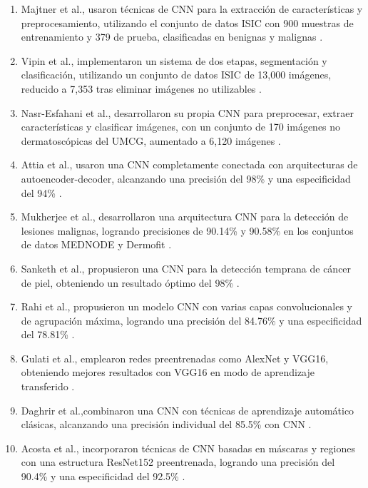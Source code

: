 \begin{enumerate}
    \item Majtner et al., usaron técnicas de CNN para la extracción de características y preprocesamiento, utilizando el conjunto de datos ISIC con 900 muestras de entrenamiento y 379 de prueba, clasificadas en benignas y malignas . 

    \item Vipin et al.,  implementaron un sistema de dos etapas, segmentación y clasificación, utilizando un conjunto de datos ISIC de 13,000 imágenes, reducido a 7,353 tras eliminar imágenes no utilizables . 

    \item Nasr-Esfahani et al.,  desarrollaron su propia CNN para preprocesar, extraer características y clasificar imágenes, con un conjunto de 170 imágenes no dermatoscópicas del UMCG, aumentado a 6,120 imágenes . 

    \item Attia et al., usaron una CNN completamente conectada con arquitecturas de autoencoder-decoder, alcanzando una precisión del 98\% y una especificidad del 94\% . 

    \item Mukherjee et al., desarrollaron una arquitectura CNN para la detección de lesiones malignas, logrando precisiones de 90.14\% y 90.58\% en los conjuntos de datos MEDNODE y Dermofit . 

    \item Sanketh et al., propusieron una CNN para la detección temprana de cáncer de piel, obteniendo un resultado óptimo del 98\% . 

    \item Rahi et al., propusieron un modelo CNN con varias capas convolucionales y de agrupación máxima, logrando una precisión del 84.76\% y una especificidad del 78.81\% . 

    \item Gulati et al., emplearon redes preentrenadas como AlexNet y VGG16, obteniendo mejores resultados con VGG16 en modo de aprendizaje transferido .
    \item Daghrir et al.,combinaron una CNN con técnicas de aprendizaje automático clásicas, alcanzando una precisión individual del 85.5\% con CNN . 

    \item Acosta et al., incorporaron técnicas de CNN basadas en máscaras y regiones con una estructura ResNet152 preentrenada, logrando una precisión del 90.4\% y una especificidad del 92.5\% .

\end{enumerate}

